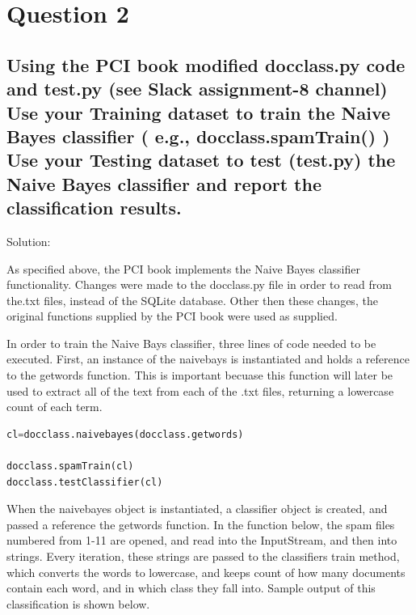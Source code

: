 \documentclass[11pt]{scrartcl} %
\begin{document}
\section*{Question 2}


\subsection*{Using the PCI book modified docclass.py code and test.py (see Slack assignment-8 channel)
Use your Training dataset to train the Naive Bayes classifier ( e.g., docclass.spamTrain() )
Use your Testing dataset to test (test.py) the Naive Bayes classifier and report the classification results.}

\bigskip\bigskip
\LARGE Solution: \newline\newline\small

\tabto{2.0 cm} As specified above, the PCI book implements the Naive Bayes classifier functionality. Changes were made to the docclass.py file in order to read from the.txt files, instead of the SQLite database. Other then these changes, the original functions supplied by the PCI book were used as supplied. \newline \newline

\tabto{2.0cm} In order to train the Naive Bays classifier, three lines of code needed to be executed. First, an instance of the naivebays is instantiated and holds a reference to the getwords function. This is important becuase this function will later be used to extract all of the text from each of the .txt files, returning a lowercase count of each term. \newline \newline

\begin{lstlisting}[language = Python, caption=test.py driver function]
cl=docclass.naivebayes(docclass.getwords)

docclass.spamTrain(cl)
docclass.testClassifier(cl)
\end{lstlisting} \bigskip 

\tabto{2.0cm} When the naivebayes object is instantiated, a classifier object is created, and passed a reference the getwords function. In the function below, the spam files numbered from 1-11 are opened, and read into the InputStream, and then into strings. Every iteration, these strings are passed to the classifiers train method, which converts the words to lowercase, and keeps count of how many documents contain each word, and in which class they fall into. Sample output of this classification is shown below.
\end{document}
